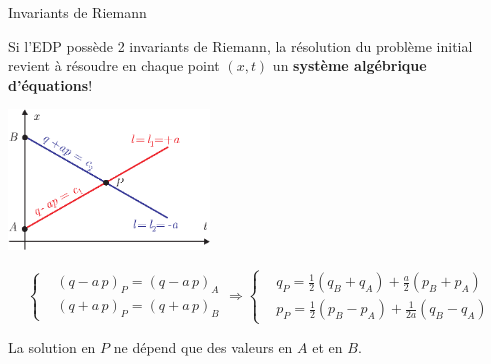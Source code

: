 \documentclass[
mode=present,    %
paper=a4paper,   %
orient=landscape,
display=slides,   %
size=10pt,
style=romain   %
]{powerdot}
\begin{document}
\begin{slide}[toc=]{Invariants de Riemann}

Si l'EDP possède 2 invariants de Riemann, la résolution du problème initial revient à résoudre en chaque point $(x,t)$ un \textbf{système algébrique d'équations}!

    \centerline{\includegraphics[width=0.4\textwidth]{riemann.eps} }

\begin{equation*}
    \left\{
    \begin{aligned}
        & (q-a\,p)_P = (q-a\,p)_A   \\
        & (q+a\,p)_P = (q+a\,p)_B
    \end{aligned}
    \right.
    \Rightarrow
    \left\{
    \begin{aligned}
        & q_P = \frac{1}{2}(q_B+q_A)+\frac{a}{2}(p_B+p_A)   \\
        & p_P = \frac{1}{2}(p_B-p_A)+\frac{1}{2a}(q_B-q_A)
    \end{aligned}
    \right.
\end{equation*}

La solution en $P$ ne dépend que des valeurs en $A$ et en $B$.

\end{slide}
\end{document}

